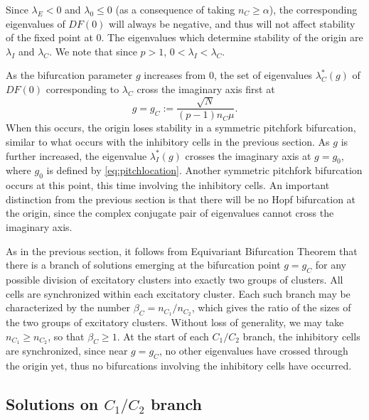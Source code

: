 \documentclass[reqno]{siamonline190516}
\begin{document}
Since $\lambda_E < 0$ and $\lambda_0 \leq 0$ (as a consequence of taking $n_C \geq \alpha$), the corresponding eigenvalues of $DF(0)$ will always be negative, and thus will not affect stability of the fixed point at 0. The eigenvalues which determine stability of the origin are $\lambda_I$ and $\lambda_C$. We note that since $p > 1$, $0 < \lambda_I < \lambda_C$.

As the bifurcation parameter $g$ increases from 0, the set of eigenvalues $\lambda_C^*(g)$ of $DF(0)$ corresponding to $\lambda_C$ cross the imaginary axis first at 
\begin{equation}
    g = g_C := \frac{\sqrt{N}}{(p-1) n_C \mu}.
\end{equation}
When this occurs, the origin loses stability in a symmetric pitchfork bifurcation, similar to what occurs with the inhibitory cells in the previous section. As $g$ is further increased, the eigenvalue $\lambda_I^*(g)$ crosses the imaginary axis at $g = g_0$, where $g_0$ is defined by \cref{eq:pitchlocation}. Another symmetric pitchfork bifurcation occurs at this point, this time involving the inhibitory cells. An important distinction from the previous section is that there will be no Hopf bifurcation at the origin, since the complex conjugate pair of eigenvalues cannot cross the imaginary axis.

As in the previous section, it follows from Equivariant Bifurcation Theorem that there is a branch of solutions emerging at the bifurcation point $g = g_C$ for any possible division of excitatory clusters into exactly two groups of clusters. All cells are synchronized within each excitatory cluster. Each such branch may be characterized by the number $\beta_C = n_{C_1}/n_{C_2}$, which gives the ratio of the sizes of the two groups of excitatory clusters. Without loss of generality, we may take $n_{C_1} \geq n_{C_2}$, so that $\beta_C \geq 1$. At the start of each $C_1/C_2$ branch, the inhibitory cells are synchronized, since near $g = g_C$, no other eigenvalues have crossed through the origin yet, thus no bifurcations involving the inhibitory cells have occurred.

\subsection{Solutions on \texorpdfstring{$C_1/C_2$}{C1/C2} branch}
\end{document}
